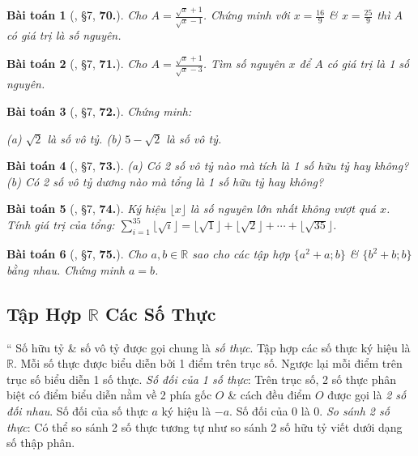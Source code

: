 \documentclass{article}
\newtheorem{baitoan}{Bài toán}
\begin{document}
\begin{baitoan}[\cite{Binh_Toan_7_tap_1}, \S7, \textbf{70.}]
	Cho $A = \frac{\sqrt{x} + 1}{\sqrt{x} - 1}$. Chứng minh với $x = \frac{16}{9}$ \& $x = \frac{25}{9}$ thì $A$ có giá trị là số nguyên.
\end{baitoan}

\begin{baitoan}[\cite{Binh_Toan_7_tap_1}, \S7, \textbf{71.}]
	Cho $A = \frac{\sqrt{x} + 1}{\sqrt{x} - 3}$. Tìm số nguyên $x$ để $A$ có giá trị là 1 số nguyên.
\end{baitoan}

\begin{baitoan}[\cite{Binh_Toan_7_tap_1}, \S7, \textbf{72.}]
	Chứng minh:
	
		(a) $\sqrt{2}$ là số vô tỷ.
		(b) $5 - \sqrt{2}$ là số vô tỷ.
	
\end{baitoan}

\begin{baitoan}[\cite{Binh_Toan_7_tap_1}, \S7, \textbf{73.}]
	
		(a) Có 2 số vô tỷ nào mà tích là 1 số hữu tỷ hay không?
		(b) Có 2 số vô tỷ dương nào mà tổng là 1 số hữu tỷ hay không?
	
\end{baitoan}

\begin{baitoan}[\cite{Binh_Toan_7_tap_1}, \S7, \textbf{74.}]
	Ký hiệu $\lfloor x\rfloor$ là số nguyên lớn nhất không vượt quá $x$. Tính giá trị của tổng: $\sum_{i=1}^{35} \lfloor\sqrt{i}\rfloor = \lfloor\sqrt{1}\rfloor + \lfloor\sqrt{2}\rfloor + \cdots + \lfloor\sqrt{35}\rfloor$.
\end{baitoan}

\begin{baitoan}[\cite{Binh_Toan_7_tap_1}, \S7, \textbf{75.}]
	Cho $a,b\in\mathbb{R}$ sao cho các tập hợp $\{a^2 + a;b\}$ \& $\{b^2 + b;b\}$ bằng nhau. Chứng minh $a = b$.
\end{baitoan}


\subsection{Tập Hợp $\mathbb{R}$ Các Số Thực}
``
	 Số hữu tỷ \& số vô tỷ được gọi chung là \textit{số thực}. Tập hợp các số thực ký hiệu là $\mathbb{R}$. Mỗi số thực được biểu diễn bởi 1 điểm trên trục số. Ngược lại mỗi điểm trên trục số biểu diễn 1 số thực.
	 \textit{Số đối của 1 số thực}: Trên trục số, 2 số thực phân biệt có điểm biểu diễn nằm về 2 phía gốc $O$ \& cách đều điểm $O$ được gọi là \textit{2 số đối nhau}. Số đối của số thực $a$ ký hiệu là $-a$. Số đối của $0$ là $0$.
	 \textit{So sánh 2 số thực}: Có thể so sánh 2 số thực tương tự như so sánh 2 số hữu tỷ viết dưới dạng số thập phân.
	
\end{document}
